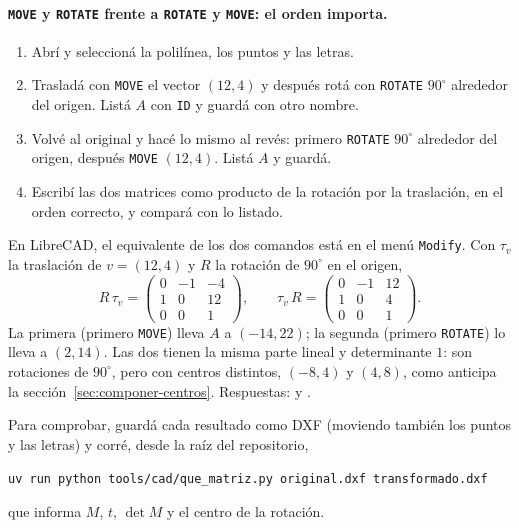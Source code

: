 \paragraph{\texttt{MOVE} y \texttt{ROTATE} frente a \texttt{ROTATE} y \texttt{MOVE}: el orden
importa.}
\begin{enumerate}
  \item Abrí  y seleccioná la polilínea, los puntos y las letras.
  \item Trasladá con \texttt{MOVE} el vector \((12,4)\) y después rotá con \texttt{ROTATE}
  \(90^\circ\) alrededor del origen. Listá \(A\) con \texttt{ID} y guardá con otro nombre.
  \item Volvé al original y hacé lo mismo al revés: primero \texttt{ROTATE} \(90^\circ\)
  alrededor del origen, después \texttt{MOVE} \((12,4)\). Listá \(A\) y guardá.
  \item Escribí las dos matrices como producto de la rotación por la traslación, en el orden
  correcto, y compará con lo listado.
\end{enumerate}
En LibreCAD, el equivalente de los dos comandos está en el menú \texttt{Modify}. Con
\(\tau_v\) la traslación de \(v=(12,4)\) y \(R\) la rotación de \(90^\circ\) en el origen,
\[
R\,\tau_v=
\begin{pmatrix}0&-1&-4\\1&0&12\\0&0&1\end{pmatrix},
\qquad
\tau_v\,R=
\begin{pmatrix}0&-1&12\\1&0&4\\0&0&1\end{pmatrix}.
\]
La primera (primero \texttt{MOVE}) lleva \(A\) a \((-14,22)\); la segunda (primero
\texttt{ROTATE}) lo lleva a \((2,14)\). Las dos tienen la misma parte lineal y determinante \(1\):
son rotaciones de \(90^\circ\), pero con centros distintos, \((-8,4)\) y \((4,8)\), como anticipa
la sección~\ref{sec:componer-centros}. Respuestas:  y
.

Para comprobar, guardá cada resultado como DXF (moviendo también los puntos y las letras) y
corré, desde la raíz del repositorio,
\begin{center}\small
\texttt{uv run python tools/cad/que\_matriz.py original.dxf transformado.dxf}
\end{center}
que informa \(M\), \(t\), \(\det M\) y el centro de la rotación.

